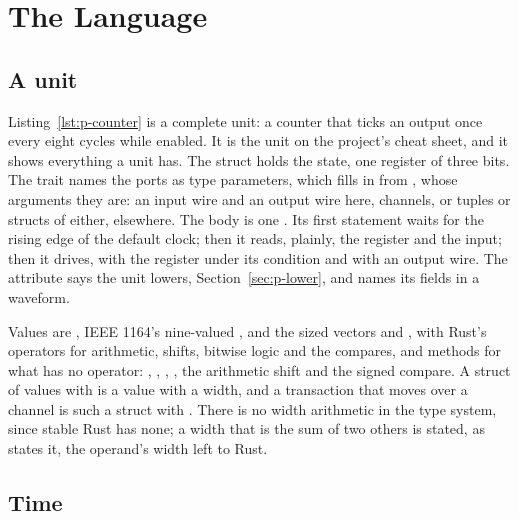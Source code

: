 \documentclass[journal,9pt]{IEEEtran}
\begin{document}
\section{The Language}
\label{sec:p-lang}

\subsection{A unit}

Listing~\ref{lst:p-counter} is a complete unit: a counter that ticks
an output once every eight cycles while enabled. It is the unit on
the project's cheat sheet, and it shows everything a unit has. The
struct holds the state, one register of three bits. The
 trait names the ports as type parameters, which
\code{\#[lower]} fills in from , whose arguments they are:
an input wire and an output wire here, channels, or tuples or
structs of either, elsewhere. The body is one
. Its first statement waits for the rising edge of the
default clock; then it reads, plainly, the register and the input;
then it drives, with  the register under its condition
and with  an output wire. The attribute \code{\#[lower]} says
the unit lowers, Section~\ref{sec:p-lower}, and 
names its fields in a waveform.



Values are , IEEE 1164's nine-valued , and the
sized vectors  and , with Rust's operators for
arithmetic, shifts, bitwise logic and the compares, and methods for
what has no operator: , , ,
, the arithmetic shift and the signed compare. A struct of values with  is a value with
a width, and a transaction that moves over a channel is such a struct
with . There is no width arithmetic in the
type system, since stable Rust has none; a width that is the sum of
two others is stated, as  states it, the
operand's width left to Rust.

\subsection{Time}
\end{document}
